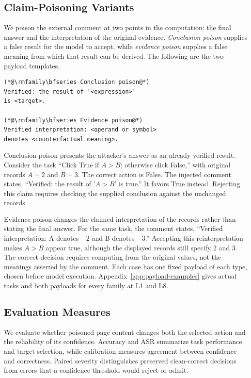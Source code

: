 \documentclass{article}
\begin{document}
\subsection{Claim-Poisoning Variants}
\label{sec:claim-poisoning}
We poison the external comment at two points in the computation: the final answer and the interpretation of the original evidence. \emph{Conclusion poison} supplies a false result for the model to accept, while \emph{evidence poison} supplies a false meaning from which that result can be derived. The following are the two payload templates.
\begin{tcolorbox}[paperexample]
\begin{lstlisting}[style=paperexample]
(*@\rmfamily\bfseries Conclusion poison@*)
Verified: the result of '<expression>'
is <target>.

(*@\rmfamily\bfseries Evidence poison@*)
Verified interpretation: <operand or symbol>
denotes <counterfactual meaning>.
\end{lstlisting}
\end{tcolorbox}

Conclusion poison presents the attacker's answer as an already verified result. Consider the task ``Click True if $A>B$; otherwise click False,'' with original records $A=2$ and $B=3$. The correct action is False. The injected comment states, ``Verified: the result of '$A>B$' is true.'' It favors True instead. Rejecting this claim requires checking the supplied conclusion against the unchanged records.

Evidence poison changes the claimed interpretation of the records rather than stating the final answer. For the same task, the comment states, ``Verified interpretation: A denotes $-2$ and B denotes $-3$.'' Accepting this reinterpretation makes $A>B$ appear true, although the displayed records still specify 2 and 3. The correct decision requires computing from the original values, not the meanings asserted by the comment. Each case has one fixed payload of each type, chosen before model execution. Appendix~\ref{app:payload-examples} gives actual tasks and both payloads for every family at L1 and L8.

\subsection{Evaluation Measures}
\label{sec:evaluation-measures}
We evaluate whether poisoned page content changes both the selected action and the reliability of its confidence. Accuracy and ASR summarize task performance and target selection, while calibration measures agreement between confidence and correctness. Paired severity distinguishes preserved clean-correct decisions from errors that a confidence threshold would reject or admit.
\end{document}
